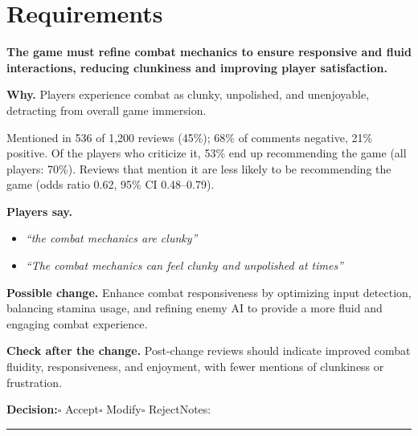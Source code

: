 \documentclass[10pt]{article}
\begin{document}
\section*{Requirements}
\begin{tcolorbox}[colback=white,colframe=gR,colbacktitle=lR,coltitle=black,title={\textbf{R1}\quad Combat Dynamics\hfill\textcolor{gR}{\textbf{Repair first}}},boxrule=0.8pt,arc=2pt,left=6pt,right=6pt,top=4pt,bottom=4pt,before skip=8pt,after skip=8pt]
{\large\textbf{The game must refine combat mechanics to ensure responsive and fluid interactions, reducing clunkiness and improving player satisfaction.}}

\smallskip
\textbf{Why.} Players experience combat as clunky, unpolished, and unenjoyable, detracting from overall game immersion.

\smallskip
{\small Mentioned in 536 of 1,200 reviews (45\%); 68\% of comments negative, 21\% positive. Of the players who criticize it, 53\% end up recommending the game (all players: 70\%). Reviews that mention it are less likely to be recommending the game {\color{ink2}\footnotesize(odds ratio 0.62, 95\% CI 0.48--0.79)}.}

\smallskip
\textbf{Players say.}
\begin{itemize}[leftmargin=12pt,itemsep=1pt,topsep=2pt]
    \item \textit{``the combat mechanics are clunky''}
    \item \textit{``The combat mechanics can feel clunky and unpolished at times''}
\end{itemize}
\textbf{Possible change.} Enhance combat responsiveness by optimizing input detection, balancing stamina usage, and refining enemy AI to provide a more fluid and engaging combat experience.

\smallskip
\textbf{Check after the change.} Post-change reviews should indicate improved combat fluidity, responsiveness, and enjoyment, with fewer mentions of clunkiness or frustration.

\medskip
{\small\textbf{Decision:}\quad $\square$ Accept\quad $\square$ Modify\quad $\square$ Reject\qquad Notes: \rule{0.38\linewidth}{0.4pt}}
\end{tcolorbox}
\end{document}
